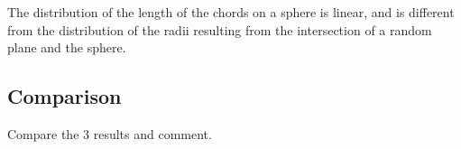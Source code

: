 \begin{rmq}The distribution of the length of the chords on a sphere is linear, and is different from the distribution of the radii resulting from the intersection of a random plane and the sphere.
\end{rmq}


\subsection{Comparison}
\begin{qbox}Compare the 3 results and comment.
 
\end{qbox}


% 
% 
% 
% 
